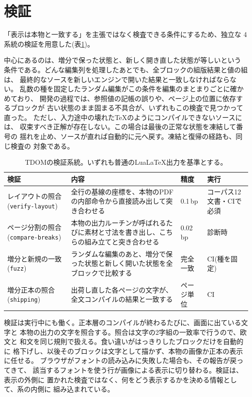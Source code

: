 \documentclass[a4paper,11pt]{ltjsarticle}
\newcommand{\tdom}{TDOM}
\newcommand{\code}[1]{\texttt{#1}}
\begin{document}
\section{検証}\label{sec:verify}

「表示は本物と一致する」を主張ではなく検査できる条件にするため、独立な
4系統の検証を用意した(表\ref{tab:referee})。

中心にあるのは、増分で保った状態と、新しく開き直した状態が等しいという
条件である。どんな編集列を処理したあとでも、全ブロックの組版結果と値の組は、
最終的なソースを新しいエンジンで開いた結果と一致しなければならない。
乱数の種を固定したランダム編集がこの条件を編集のまとまりごとに確かめており、
開発の過程では、参照値の記帳の誤りや、ページ上の位置に依存するブロックが
古い状態のまま固まる不具合が、いずれもこの検査で見つかって直った。
ただし、入力途中の壊れた\TeX{}のようにコンパイルできないソースには、
収束すべき正解が存在しない。この場合は最後の正常な状態を凍結して番号の
揺れを止め、ソースが直れば自動的に元へ戻す。凍結と復帰の経路も、同じ検査の
対象である。

\begin{table}[tb]
  \centering\small
  \caption{\tdom{}の検証系統。いずれも普通のLuaLaTeX出力を基準とする。}
  \label{tab:referee}
  \begin{tabular}{@{}p{31mm}p{63mm}p{18mm}p{22mm}@{}}
    \toprule
    検証 & 内容 & 精度 & 実行\\
    \midrule
    レイアウトの照合\newline(\code{verify-layout}) & 全行の基線の座標を、本物のPDFの内部命令から直接読み出して突き合わせる & 0.1\,bp & コーパス12文書・CIで必須\\
    ページ分割の照合\newline(\code{compare-breaks}) & 本物の出力ルーチンが呼ばれるたびに素材と寸法を書き出し、こちらの組み立てと突き合わせる & 0.02\,bp & 診断時\\
    増分と新規の一致\newline(\code{fuzz}) & ランダムな編集のあと、増分で保った状態と新しく開いた状態を全ブロックで比較する & 完全一致 & CI(種を固定)\\
    増分正本の照合\newline(\code{shipping}) & 出荷し直した各ページの文字が、全文コンパイルの結果と一致する & ページ単位 & CI\\
    \bottomrule
  \end{tabular}
\end{table}

検証は実行中にも働く。正本層のコンパイルが終わるたびに、画面に出ている文字と
本物の出力の文字を照合する。照合は文字の2字組の一致率で行うので、欧文と
和文を同じ規則で扱える。食い違いがはっきりしたブロックだけを自動的に
格下げし、以後そのブロックは文字として描かず、本物の画像か正本の表示に任せる。
ブラウザがフォントの読み込みに失敗した場合も、その報告が戻ってきて、
該当するフォントを使う行が画像による表示に切り替わる。検証は、表示の外側に
置かれた検査ではなく、何をどう表示するかを決める情報として、系の内側に
組み込まれている。
\end{document}
